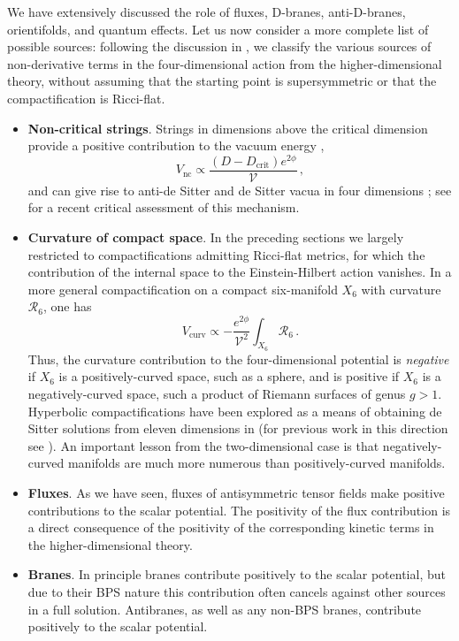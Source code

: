 \documentclass[12pt,a4wide]{article}
\def\V{\mathcal{V}}
\def\be{\begin{equation}}
\def\ee{\end{equation}}
\begin{document}
We have extensively discussed the role of fluxes, D-branes, anti-D-branes, orientifolds, and quantum effects.
Let us now consider a more complete list of possible sources:
following the discussion in \cite{Silverstein:2004id}, we classify the various sources of non-derivative terms in the four-dimensional action from the higher-dimensional theory, without assuming that the starting point is supersymmetric or that the compactification is Ricci-flat.
\begin{itemize}
\item {\bf Non-critical strings}. Strings in dimensions above the critical dimension provide a positive contribution to the vacuum energy \cite{Silverstein:2004id},
\be
V_{\text{nc}}\propto \frac{\left ( D-D_{\text{crit}}\right ) e^{2\phi}}{\V}\,,
\ee
and can give rise to anti-de Sitter and de Sitter vacua in four dimensions \cite{Silverstein:2001xn,Maloney:2002rr}; see \cite{Junghans:2023lpo} for a recent critical assessment of this mechanism.

\item{\bf Curvature of compact space}. In the preceding sections we largely restricted to compactifications admitting Ricci-flat metrics, for which the contribution of the internal space to the Einstein-Hilbert action vanishes.  In a more general compactification on a compact six-manifold $X_6$ with curvature $\mathcal{R}_6$, one has \cite{Silverstein:2004id}
\be
V_{\text{curv}}\propto -\frac{e^{2\phi}}{\V^2} \int_{X_6} \mathcal{R}_6 \,.
\ee
Thus, the curvature contribution to the four-dimensional potential is \emph{negative} if $X_6$ is a positively-curved space, such as a sphere, and is positive if $X_6$ is a negatively-curved space, such 
a product of Riemann surfaces of genus $g>1$. Hyperbolic compactifications have been explored as a means of obtaining de Sitter solutions from eleven dimensions in \cite{DeLuca:2021pej} (for previous work in this direction see \cite{Silverstein:2007ac}).  An important lesson from the two-dimensional case is that negatively-curved manifolds are much more numerous than positively-curved manifolds.

\item{\bf Fluxes}. As we have seen, fluxes of antisymmetric tensor fields make positive contributions to the scalar potential.
The positivity of the flux contribution is a direct consequence of the positivity of the corresponding kinetic terms in the higher-dimensional theory.

\item{\bf Branes}. In principle branes contribute  positively to the scalar potential, but due to their BPS nature this contribution often cancels against other sources in a full solution.  Antibranes, as well as any non-BPS branes, contribute positively to the scalar potential.


\end{itemize}
\end{document}
